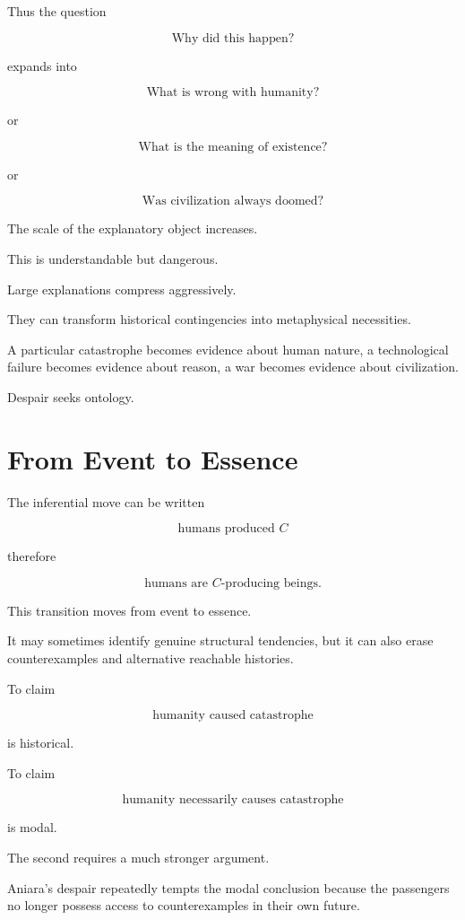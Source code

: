 \documentclass[11pt,oneside]{book}
\theoremstyle{definition}
\theoremstyle{remark}
\begin{document}
Thus the question

\[
\text{Why did this happen?}
\]

expands into

\[
\text{What is wrong with humanity?}
\]

or

\[
\text{What is the meaning of existence?}
\]

or

\[
\text{Was civilization always doomed?}
\]

The scale of the explanatory object increases.

This is understandable but dangerous.

Large explanations compress aggressively.

They can transform historical contingencies into metaphysical necessities.

A particular catastrophe becomes evidence about human nature, a technological failure becomes evidence about reason, a war becomes evidence about civilization.

Despair seeks ontology.

\section{From Event to Essence}

The inferential move can be written

\[
\text{humans produced }C
\]

therefore

\[
\text{humans are }C\text{-producing beings}.
\]

This transition moves from event to essence.

It may sometimes identify genuine structural tendencies, but it can also erase counterexamples and alternative reachable histories.

To claim

\[
\text{humanity caused catastrophe}
\]

is historical.

To claim

\[
\text{humanity necessarily causes catastrophe}
\]

is modal.

The second requires a much stronger argument.

Aniara's despair repeatedly tempts the modal conclusion because the passengers no longer possess access to counterexamples in their own future.
\end{document}

